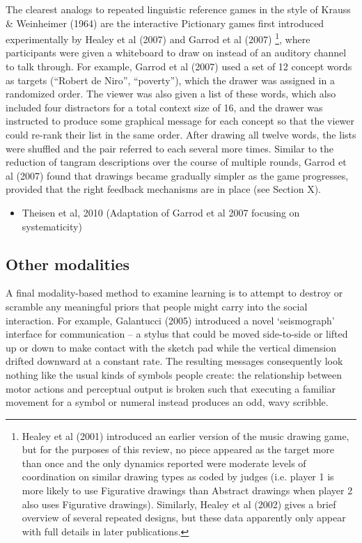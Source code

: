 \documentclass[11pt, floatsintext, man]{apa6}
\begin{document}
The clearest analogs to repeated linguistic reference games in the style of Krauss \& Weinheimer (1964) are the interactive Pictionary games first introduced experimentally by Healey et al (2007) and Garrod et al (2007)
\footnote{Healey et al (2001) introduced an earlier version of the music drawing game, but for the purposes of this review, no piece appeared as the target more than once and the only dynamics reported were moderate levels of coordination on similar drawing types as coded by judges (i.e. player 1 is more likely to use Figurative drawings than Abstract drawings when player 2 also uses Figurative drawings). Similarly, Healey et al (2002) gives a brief overview of several repeated designs, but these data apparently only appear with full details in later publications.
}, 
where participants were given a whiteboard to draw on instead of an auditory channel to talk through. For example, Garrod et al (2007) used a set of 12 concept words as targets (``Robert de Niro'', ``poverty''), which the drawer was assigned in a randomized order. The viewer was also given a list of these words, which also included four distractors for a total context size of 16, and the drawer was instructed to produce some graphical message for each concept so that the viewer could re-rank their list in the same order. After drawing all twelve words, the lists were shuffled and the pair referred to each several more times. Similar to the reduction of tangram descriptions over the course of multiple rounds, Garrod et al (2007) found that drawings became gradually simpler as the game progresses, provided that the right feedback mechanisms are in place (see Section X). 

\begin{itemize}
\item Theisen et al, 2010 (Adaptation of Garrod et al 2007 focusing on systematicity)
\end{itemize}

\subsection{Other modalities}

A final modality-based method to examine learning is to attempt to destroy or scramble any meaningful priors that people might carry into the social interaction. For example, Galantucci (2005) introduced a novel `seismograph' interface for communication -- a stylus that could be moved side-to-side or lifted up or down to make contact with the sketch pad while the vertical dimension drifted downward at a constant rate. The resulting messages consequently look nothing like the usual kinds of symbols people create: the relationship between motor actions and perceptual output is broken such that executing a familiar movement for a symbol or numeral instead produces an odd, wavy scribble. 
\end{document}
